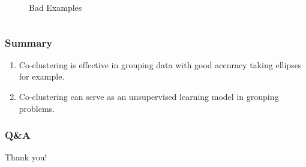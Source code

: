 \documentclass[aspectratio=169]{beamer}
\begin{document}
\begin{frame}
\begin{columns}
\begin{column}{.5\linewidth}
\begin{figure}[htbp]
{                    }
                    \caption{Bad Examples}
                \end{figure}
            \end{column}
        \end{columns}
        

    \end{frame}



    \begin{frame}
        \frametitle{Summary}
    
        \begin{enumerate}
            \item Co-clustering is effective in grouping data with good accuracy taking ellipses for example. 
            \item Co-clustering can serve as an unsupervised learning model in grouping problems.
            
        \end{enumerate}
    
    \end{frame}
    \begin{frame}
        \frametitle{Q\&A}
    
        Thank you!
    
    \end{frame}
\end{document}
